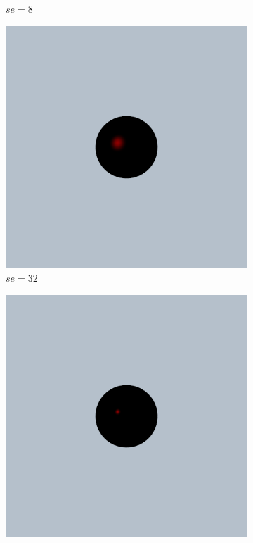 \documentclass{article}
\begin{document}
\begin{figure}[h!]
\begin{subfigure}{0.2\textwidth}
		\caption{$se = 8$}
		\label{fig:specular_0_2_8}
	\end{subfigure}%
	\hfill
	\begin{subfigure}{0.2\textwidth}
		\includegraphics[width=\textwidth]{specular_sc_0_2_se_32}
		\caption{$se = 32$}
		\label{fig:specular_0_2_32}
	\end{subfigure}%
	\hfill
	\begin{subfigure}{0.2\textwidth}
		\includegraphics[width=\textwidth]{specular_sc_0_2_se_256}

\end{subfigure}
\end{figure}
\end{document}
